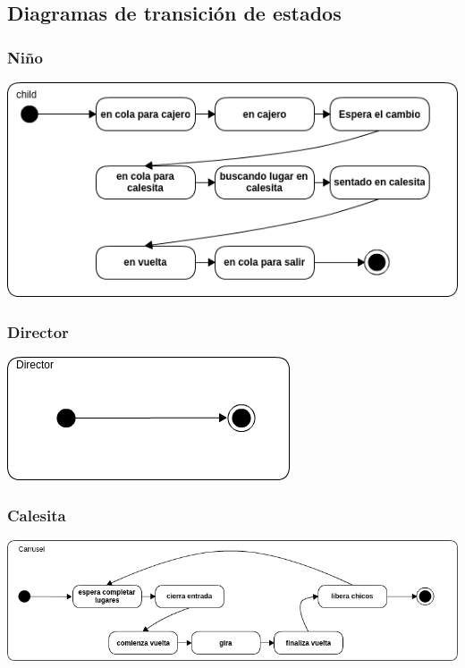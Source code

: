 \documentclass[a4paper,10pt]{article}
\begin{document}
\clearpage

    \subsection{Diagramas de transición de estados}
	\subsubsection{Niño}
	\begin{center}
        \includegraphics[scale=0.7]{chicos.png}
    \end{center}
    
    \subsubsection{Director}
    \begin{center}
        \includegraphics[scale=0.7]{director.png}
    \end{center}
    
	\subsubsection{Calesita}
    \begin{center}
        \includegraphics[scale=0.6]{calesita.png}
    \end{center}
\end{document}

